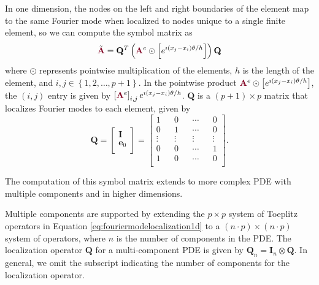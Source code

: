 In one dimension, the nodes on the left and right boundaries of the element map to the same Fourier mode when localized to nodes unique to a single finite element, so we can compute the symbol matrix as
\begin{equation}
\tilde{{\color{burgundy}\mathbf{A}}} = \mathbf{Q}^T \left( {\color{burgundy}\mathbf{A}}^e \odot \left[ e^{\imath \left( x_j - x_i \right) \theta / h} \right] \right) \mathbf{Q}
\end{equation}
where $\odot$ represents pointwise multiplication of the elements, $h$ is the length of the element, and $i, j \in \left\lbrace 1, 2, \dots, p + 1 \right\rbrace$.
In the pointwise product ${\color{burgundy}\mathbf{A}}^e \odot \left[ e^{\imath \left( x_j - x_i \right) \theta / h} \right]$, the $\left( i, j \right)$ entry is given by $\left[ {\color{burgundy}\mathbf{A}}^e \right]_{i, j} e^{\imath \left( x_j - x_i \right) \theta / h}$.
$\mathbf{Q}$ is a $\left( p + 1 \right) \times p$ matrix that localizes Fourier modes to each element, given by
\begin{equation}
\mathbf{Q} =
\begin{bmatrix}
    \mathbf{I}   \\
    \mathbf{e}_0 \\
\end{bmatrix} =
\begin{bmatrix}
    1      && 0      && \cdots && 0      \\
    0      && 1      && \cdots && 0      \\
    \vdots && \vdots && \vdots && \vdots \\
    0      && 0      && \cdots && 1      \\
    1      && 0      && \cdots && 0      \\
\end{bmatrix}.
\label{eq:fouriermodelocalization1d}
\end{equation}

The computation of this symbol matrix extends to more complex PDE with multiple components and in higher dimensions.

Multiple components are supported by extending the $p \times p$ system of Toeplitz operators in Equation \ref{eq:fouriermodelocalization1d} to a $\left( n \cdot p \right) \times \left( n \cdot p \right)$ system of operators, where $n$ is the number of components in the PDE.
The localization operator $\mathbf{Q}$ for a multi-component PDE is given by $\mathbf{Q}_n = \mathbf{I}_n \otimes \mathbf{Q}$.
In general, we omit the subscript indicating the number of components for the localization operator.

